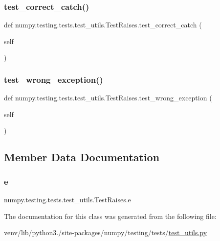 \subsubsection{\texorpdfstring{test\+\_\+correct\+\_\+catch()}{test\_correct\_catch()}}
{\footnotesize\ttfamily def numpy.\+testing.\+tests.\+test\+\_\+utils.\+Test\+Raises.\+test\+\_\+correct\+\_\+catch (\begin{DoxyParamCaption}\item[{}]{self }\end{DoxyParamCaption})}

\mbox{\label{classnumpy_1_1testing_1_1tests_1_1test__utils_1_1TestRaises_ae185c1f77504c3bafcfa7a24729ed542}} 
\subsubsection{\texorpdfstring{test\+\_\+wrong\+\_\+exception()}{test\_wrong\_exception()}}
{\footnotesize\ttfamily def numpy.\+testing.\+tests.\+test\+\_\+utils.\+Test\+Raises.\+test\+\_\+wrong\+\_\+exception (\begin{DoxyParamCaption}\item[{}]{self }\end{DoxyParamCaption})}



\subsection{Member Data Documentation}
\mbox{\label{classnumpy_1_1testing_1_1tests_1_1test__utils_1_1TestRaises_a124120008f8d59b345ece635dafa4e11}} 
\subsubsection{\texorpdfstring{e}{e}}
{\footnotesize\ttfamily numpy.\+testing.\+tests.\+test\+\_\+utils.\+Test\+Raises.\+e}



The documentation for this class was generated from the following file\+:\begin{DoxyCompactItemize}
\item 
venv/lib/python3./site-\/packages/numpy/testing/tests/\hyperlink{numpy_2testing_2tests_2test__utils_8py}{test\+\_\+utils.\+py}\end{DoxyCompactItemize}
